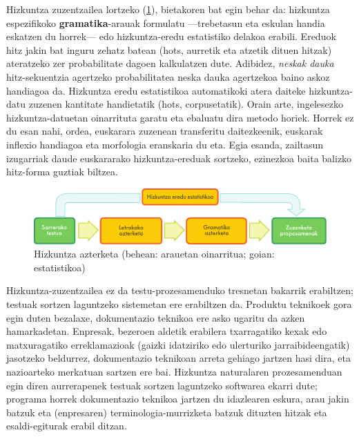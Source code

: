 \begin{multicols}{2}
Hizkuntza zuzentzailea lortzeko (\ref{fig:langcheckingaarch_eu}), bietakoren bat egin behar da: hizkuntza espezifikoko \textbf{gramatika}-arauak formulatu —trebetasun eta eskulan handia eskatzen du horrek— edo hizkuntza-eredu estatistiko delakoa erabili. Ereduok hitz jakin bat inguru zehatz batean (hots, aurretik eta atzetik dituen hitzak) ateratzeko zer probabilitate dagoen kalkulatzen dute. Adibidez, \textit{neskak dauka} hitz-sekuentzia agertzeko probabilitatea neska dauka agertzekoa baino askoz handiagoa da. Hizkuntza eredu estatistikoa automatikoki atera daiteke hizkuntza-datu zuzenen kantitate handietatik (hots, corpusetatik). Orain arte, ingelesezko hizkuntza-datuetan oinarrituta garatu eta ebaluatu dira metodo horiek. Horrek ez du esan nahi, ordea, euskarara zuzenean transferitu daitezkeenik, euskarak inflexio handiagoa eta morfologia eranskaria du eta. Egia esanda, zailtasun izugarriak daude euskararako hizkuntza-ereduak sortzeko, ezinezkoa baita balizko hitz-forma guztiak biltzea. 

 \begin{figure}[htb]
  \center
  \includegraphics[width=\textwidth]{../_media/basque/language_checking}
  \caption{Hizkuntza azterketa (behean: arauetan oinarritua; goian: estatistikoa)}
  \label{fig:langcheckingaarch_eu}
\end{figure}

Hizkuntza-zuzentzailea ez da testu-prozesamenduko tresnetan bakarrik erabiltzen; testuak sortzen laguntzeko sistemetan ere erabiltzen da. Produktu teknikoek gora egin duten bezalaxe, dokumentazio teknikoa ere asko ugaritu da azken hamarkadetan. Enpresak, bezeroen aldetik erabilera txarragatiko kexak edo matxuragatiko erreklamazioak (gaizki idatziriko edo ulerturiko jarraibideengatik) jasotzeko beldurrez, dokumentazio teknikoan arreta gehiago jartzen hasi dira, eta nazioarteko merkatuan sartzen ere bai. Hizkuntza naturalaren prozesamenduan egin diren aurrerapenek testuak sortzen laguntzeko softwarea ekarri dute; programa horrek dokumentazio teknikoa jartzen du idazlearen eskura, arau jakin batzuk eta (enpresaren) terminologia-murrizketa batzuk dituzten hitzak eta esaldi-egiturak erabil ditzan. 


\end{multicols}
